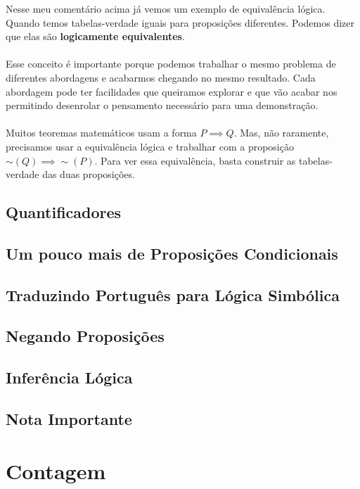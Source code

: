 \documentclass[a4paper,11pt]{book}
\theoremstyle{definition}
\begin{document}
Nesse meu comentário acima já vemos um exemplo de equivalência lógica. Quando temos tabelas-verdade iguais para proposições diferentes. Podemos dizer que elas são \textbf{logicamente equivalentes}.
\\
\\
Esse conceito é importante porque podemos trabalhar o mesmo problema de diferentes abordagens e acabarmos chegando no mesmo resultado. Cada abordagem pode ter facilidades que queiramos explorar e que vão acabar nos permitindo desenrolar o pensamento necessário para uma demonstração.
\\
\\
Muitos teoremas matemáticos usam a forma $P \implies Q$. Mas, não raramente, precisamos usar a equivalência lógica e trabalhar com a proposição $\sim (Q) \implies \sim (P)$. Para ver essa equivalência, basta construir as tabelas-verdade das duas proposições.



\section{Quantificadores}
\section{Um pouco mais de Proposições Condicionais}
\section{Traduzindo Português para Lógica Simbólica}
\section{Negando Proposições}
\section{Inferência Lógica}
\section{Nota Importante}

\chapter{Contagem}
\end{document}
